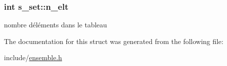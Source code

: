 \subsubsection[{\texorpdfstring{n\+\_\+elt}{n_elt}}]{\setlength{\rightskip}{0pt plus 5cm}int s\+\_\+set\+::n\+\_\+elt}\hypertarget{structs__set_ac5d24903f7f143cd44e352c622837c64}{}\label{structs__set_ac5d24903f7f143cd44e352c622837c64}
nombre d\textquotesingle{}éléments dans le tableau 

The documentation for this struct was generated from the following file\+:\begin{DoxyCompactItemize}
\item 
include/\hyperlink{ensemble_8h}{ensemble.\+h}\end{DoxyCompactItemize}
